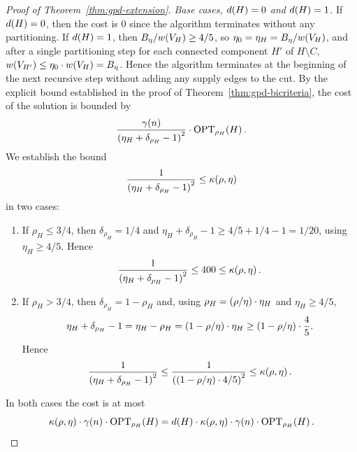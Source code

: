 \begin{proof}[Proof of Theorem~\ref{thm:gpd-extension}]
    \emph{Base cases, $d\br{H}=0$ and $d\br{H}=1$.} If $d\br{H}=0$, then the cost is $0$ since the algorithm terminates without any partitioning. If $d\br{H}=1$, then $B_\eta/w\br{V_H}\geq 4/5$, so $\eta_0=\eta_H=B_\eta/w\br{V_H}$, and after a single partitioning step for each connected component $H'$ of $H\setminus C$, $w\br{V_{H'}}\leq \eta_0 \cdot w\br{V_H}=B_\eta$. Hence the algorithm terminates at the beginning of the next recursive step without adding any supply edges to the cut. By the explicit bound established in the proof of Theorem~\ref{thm:gpd-bicriteria}, the cost of the solution is bounded by 
    \[
    \frac{\gamma\br{n}}{\br{\eta_H+\delta_{\rho_H}-1}^2}\cdot \OPTdem{H}{\rho_H}.
    \]
    We establish the bound 
    \[
    \frac{1}{\br{\eta_H+\delta_{\rho_H}-1}^2}\leq \kappa\br{\rho,\eta}
    \]
    in two cases:
    \begin{enumerate}
        \item If $\rho_H\leq 3/4$, then $\delta_{\rho_H}=1/4$ and $\eta_H+\delta_{\rho_H}-1\geq 4/5+1/4-1=1/20$, using $\eta_H\geq 4/5$. Hence 
        \[\frac{1}{\br{\eta_H+\delta_{\rho_H}-1}^2}\leq 400\leq \kappa\br{\rho,\eta}.\]
        \item If $\rho_H> 3/4$, then $\delta_{\rho_H}=1-\rho_H$ and, using $\rho_H=\br{\rho/\eta}\cdot\eta_H$ and $\eta_H\geq 4/5$,
        \[
            \eta_H+\delta_{\rho_H}-1=\eta_H-\rho_H=\br{1-\rho/\eta}\cdot\eta_H\geq \br{1-\rho/\eta}\cdot\frac{4}{5}.
        \]
        Hence 
        \[
        \frac{1}{\br{\eta_H+\delta_{\rho_H}-1}^2}\leq \frac{1}{\br{\br{1-\rho/\eta}\cdot 4/5}^2}\leq \kappa\br{\rho,\eta}.
        \]
    \end{enumerate}
    In both cases the cost is at most 
    \[\kappa\br{\rho,\eta}\cdot\gamma\br{n}\cdot \OPTdem{H}{\rho_H}=d\br{H}\cdot \kappa\br{\rho,\eta}\cdot\gamma\br{n}\cdot\OPTdem{H}{\rho_H}.\]
 

\end{proof}

